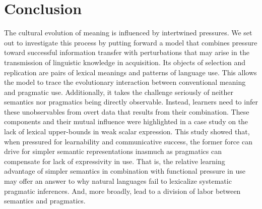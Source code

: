 \documentclass[a4paper, 11pt]{article}
\theoremstyle{Satz}
\begin{document}
\section{Conclusion}
The cultural evolution of meaning is influenced by intertwined pressures. We set out to
investigate this process by putting forward a model that combines pressure toward successful
information transfer with perturbations that may arise in the transmission of linguistic
knowledge in acquisition. Its objects of selection and replication are pairs of lexical
meanings and patterns of language use. This allows the model to trace the evolutionary interaction between
conventional meaning and pragmatic use. Additionally, it takes the challenge seriously of
neither semantics nor pragmatics being directly observable. Instead, learners need to infer
these unobservables from overt data that results from their combination.  These components and
their mutual influence were highlighted in a case study on the lack of lexical upper-bounds in
weak scalar expression. This study showed that, when pressured for learnability and communicative
success, the former force can drive for simpler semantic representations inasmuch as pragmatics
can compensate for lack of expressivity in use. That is, the relative learning advantage of
simpler semantics in combination with functional pressure in use may offer an answer to why
natural languages fail to lexicalize systematic pragmatic inferences. And, more broadly, lead to a
division of labor between semantics and pragmatics.



\end{document}

